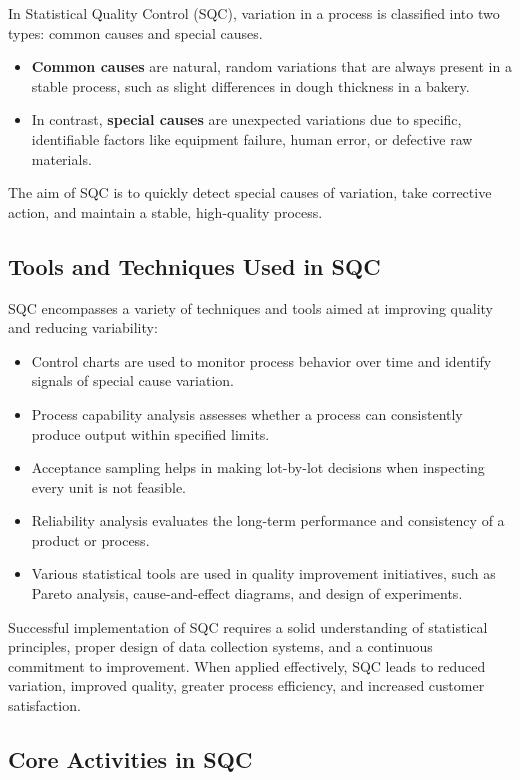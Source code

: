 \documentclass[twoside]{book}
\begin{document}
In Statistical Quality Control (SQC), variation in a process is classified into two types: common causes and special causes.

\begin{itemize}
\item \textbf{Common causes} are natural, random variations that are always present in a stable process, such as slight differences in dough thickness in a bakery.

\item In contrast,\textbf{ special causes} are unexpected variations due to specific, identifiable factors like equipment failure, human error, or defective raw materials.
\end{itemize}

The aim of SQC is to quickly detect special causes of variation, take corrective action, and maintain a stable, high-quality process.

\subsection{Tools and Techniques Used in SQC}
SQC encompasses a variety of techniques and tools aimed at improving quality and reducing variability:
\begin{itemize}
\item Control charts are used to monitor process behavior over time and identify signals of special cause variation.
\item Process capability analysis assesses whether a process can consistently produce output within specified limits.
\item Acceptance sampling helps in making lot-by-lot decisions when inspecting every unit is not feasible.
\item Reliability analysis evaluates the long-term performance and consistency of a product or process.
\item Various statistical tools are used in quality improvement initiatives, such as Pareto analysis, cause-and-effect diagrams, and design of experiments.
\end{itemize}

Successful implementation of SQC requires a solid understanding of statistical principles, proper design of data collection systems, and a continuous commitment to improvement. When applied effectively, SQC leads to reduced variation, improved quality, greater process efficiency, and increased customer satisfaction.

\subsection{Core Activities in SQC}
\end{document}
